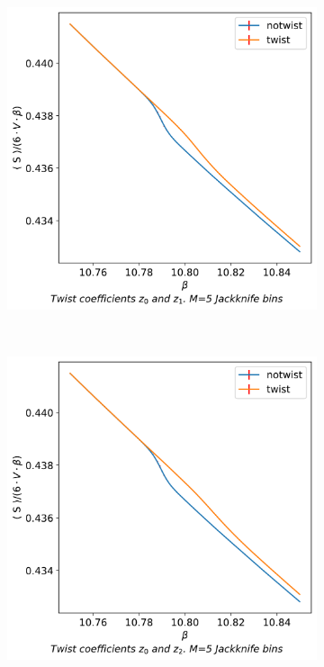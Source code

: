 \documentclass[english,twoside,openright]{UH_TCM_MSc}
\begin{document}
\begin{figure}[htb]
    \centering
    \begin{subfigure}[t]{0.5\textwidth}
        \centering
        \includegraphics[width=\textwidth]{final_plots/action_volume_comparison/action_24_24_36.pdf}
    \end{subfigure}%
    ~
    \begin{subfigure}[t]{0.5\textwidth}
        \centering
        \includegraphics[width=\textwidth]{final_plots/action_volume_comparison/action_24_24_36_0-2.pdf}

\end{subfigure}
\end{figure}
\end{document}
